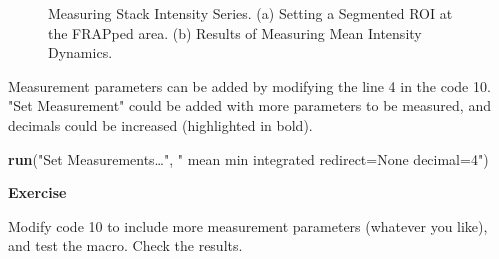 \documentclass[11pt,a4paper,oneside]{report}
\newenvironment{indentexercise}[1]%
{{\setlength{\leftmargin}{2em}}%
\textbf{Exercise \thesubsection-#1}%
\begin{list}{}%
	\item%
}
{\end{list}}
\newenvironment{indentCom}%
{\begin{list}{}%
         {\setlength{\leftmargin}{1em}}%
         \item[]%
}
{\end{list}}
\begin{document}
\begin{figure}[htbp]
 \centering
 \caption{Measuring Stack Intensity Series. (a) Setting a Segmented ROI at the FRAPped area. (b) Results of Measuring Mean Intensity Dynamics.}
 \label{fig:frapresults}
\end{figure}


Measurement parameters can be added by modifying the line 4 in the code 10. "Set Measurement" could be added with more parameters to be measured, and decimals could be increased (highlighted in bold).
\begin{indentCom}
\textbf{run}("Set Measurements\ldots", "  mean min integrated redirect=None decimal=4")
\end{indentCom}

\begin{indentexercise}{1}
Modify code 10 to include more measurement parameters (whatever you like), and test the macro. Check the results. 
\end{indentexercise}
\end{document}
